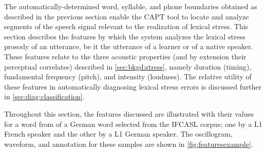 	The automatically-determined word, syllable, and phone boundaries obtained as described in the previous section 
	enable the CAPT tool to locate and analyze segments of the speech signal relevant to the realization of lexical stress.
	This section describes the features by which the system analyzes the lexical stress prosody of an utterance, be it the utterance of a learner or of a native speaker. These features relate to the three acoustic properties (and by extension their perceptual correlates) described in \cref{sec:bkgd:stress}, namely duration (timing), fundamental frequency (pitch), and intensity (loudness). 
	The relative utility of these features in automatically diagnosing lexical stress errors is discussed further in \cref{sec:diag:classification}.
%
%	



	Throughout this section, the features discussed are illustrated with their values for a word from  of a German word selected from the IFCASL corpus; one by a L1 French speaker and the other by a L1 German speaker. The oscillogram, waveform, and annotation for these samples are shown in \cref{fig:featuresexample}.
	

